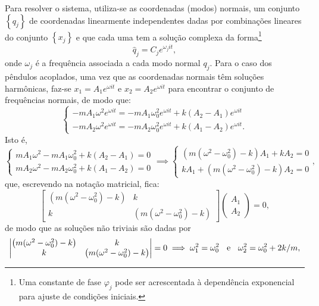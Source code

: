 \documentclass[a4paper, 11pt]{article}
\begin{document}
	Para resolver o sistema, utiliza-se as coordenadas (modos) normais, um conjunto $\left\lbrace q_j\right\rbrace$ de coordenadas linearmente independentes dadas por combinações lineares do conjunto $\left\lbrace x_j\right\rbrace$ e que cada uma tem a solução complexa da forma\footnote{Uma constante de fase $\varphi_j$ pode ser acrescentada à dependência exponencial para ajuste de condições iniciais.}
	\begin{equation}
	\hat{q}_j = C_je^{\omega_jit},
	\end{equation}
onde $\omega_j$ é a frequência associada a cada modo normal $q_j$. Para o caso dos pêndulos acoplados, uma vez que as coordenadas normais têm soluções harmônicas, faz-se $x_1 = A_1e^{\omega it}$ e $x_2 = A_2e^{\omega it}$ para encontrar o conjunto de frequências normais, de modo que:
	\begin{equation}
	\begin{cases}
	-mA_1\omega^2e^{\omega it} = - mA_1\omega_0^2e^{\omega it} + k (A_2-A_1)e^{\omega it}\\
	-mA_2\omega^2e^{\omega it} = - mA_2\omega_0^2e^{\omega it} + k (A_1-A_2)e^{\omega it}.
	\end{cases}
	\end{equation}
Isto é,
	\begin{equation}
	\begin{cases}
		mA_1\omega^2 - mA_1\omega_0^2 + k (A_2-A_1) = 0 \\
		mA_2\omega^2 - mA_2\omega_0^2 + k (A_1-A_2) = 0
	\end{cases}
	\implies
	\begin{cases}
		\left( m(\omega^2-\omega_0^2) - k\right) A_1 + k A_2 = 0  \\
		kA_1 + \left( m(\omega^2-\omega_0^2) - k\right) A_2 = 0 
	\end{cases},
	\end{equation}
que, escrevendo na notação matricial, fica:
	\begin{equation}
	\left[\begin{matrix}
	\left( m(\omega^2-\omega_0^2) - k\right) & k \\
	k & \left( m(\omega^2-\omega_0^2) - k\right)
	\end{matrix}\right]
	\left(\begin{matrix}
	A_1\\
	A_2
	\end{matrix}\right)
	= 0,
	\end{equation}
de modo que as soluções não triviais são dadas por
	\begin{equation}
	\left|\begin{matrix}
	\left( m(\omega^2-\omega_0^2) - k\right) & k \\
	k & \left( m(\omega^2-\omega_0^2) - k\right)
	\end{matrix}\right|
	= 0 \implies \omega_1^2 = \omega_0^2 \hspace{0.2cm}\text{ e }\hspace{0.2cm} \omega_2^2 = \omega_0^2+2k/m,
	\end{equation}
\end{document}
